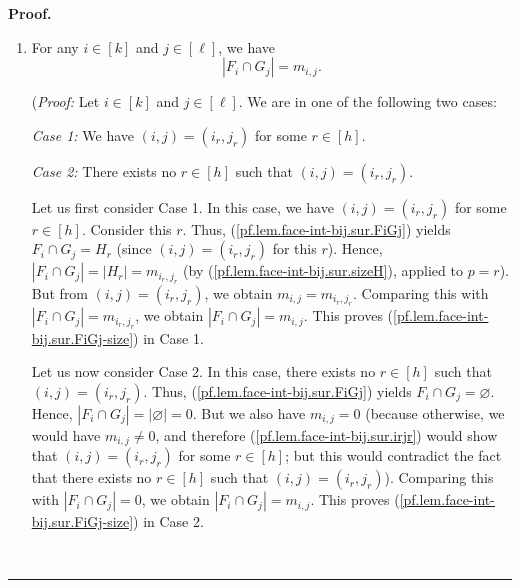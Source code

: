 \documentclass[12pt]{article}
\theoremstyle{definition}%
\theoremstyle{definition}%
\theoremstyle{remark}%
\newcommand{\interval}[1]{\left[ #1 \right]} %
\newenvironment{proof}[1][Proof]{\noindent\textbf{#1.} }{\ \rule{0.5em}{0.5em}}
\begin{document}
\begin{proof}
\begin{enumerate}
Forget that we fixed $x$. We thus have obtained a contradiction for each $x\in
F_{i}\cap G_{j}$. Hence, there exists no such $x$. In other words, $F_{i}\cap
G_{j}=\varnothing$. This completes the proof of
(\ref{pf.lem.face-int-bij.sur.FiGj}) in Case 2.

We have now proved (\ref{pf.lem.face-int-bij.sur.FiGj}) in both Cases 1 and 2;
this completes the proof of (\ref{pf.lem.face-int-bij.sur.FiGj}).)

\item For any $i\in\interval{k}  $ and $j\in\interval{\ell}$, we
have
\begin{equation}
\left\vert F_{i}\cap G_{j}\right\vert =m_{i,j} .
\label{pf.lem.face-int-bij.sur.FiGj-size}
\end{equation}


(\textit{Proof:} Let $i\in\interval{k}  $ and $j\in\interval{\ell}$.
We are in one of the following two cases:

\textit{Case 1:} We have $\left(  i,j\right)  =\left(  i_{r},j_{r}\right)  $
for some $r\in\interval{h} $.

\textit{Case 2:} There exists no $r\in\interval{h} $ such that $\left(
i,j\right)  =\left(  i_{r},j_{r}\right)  $.

Let us first consider Case 1. In this case, we have $\left(  i,j\right)
=\left(  i_{r},j_{r}\right)  $ for some $r\in\interval{h} $. Consider
this $r$. Thus, (\ref{pf.lem.face-int-bij.sur.FiGj}) yields $F_{i}\cap
G_{j}=H_{r}$ (since $\left(  i,j\right)  =\left(  i_{r},j_{r}\right)  $ for
this $r$). Hence, $\left\vert F_{i}\cap G_{j}\right\vert =\left\vert
H_{r}\right\vert =m_{i_{r},j_{r}}$ (by (\ref{pf.lem.face-int-bij.sur.sizeH}),
applied to $p=r$). But from $\left(  i,j\right)  =\left(  i_{r},j_{r}\right)
$, we obtain $m_{i,j}=m_{i_{r},j_{r}}$. Comparing this with $\left\vert
F_{i}\cap G_{j}\right\vert =m_{i_{r},j_{r}}$, we obtain $\left\vert F_{i}\cap
G_{j}\right\vert =m_{i,j}$. This proves
(\ref{pf.lem.face-int-bij.sur.FiGj-size}) in Case 1.

Let us now consider Case 2. In this case, there exists no $r\in
\interval{h}$ such that $\left(  i,j\right)  =\left(  i_{r},j_{r}\right)  $.
Thus, (\ref{pf.lem.face-int-bij.sur.FiGj}) yields $F_{i}\cap G_{j}
=\varnothing$. Hence, $\left\vert F_{i}\cap G_{j}\right\vert =\left\vert
\varnothing\right\vert =0$. But we also have $m_{i,j}=0$ (because otherwise,
we would have $m_{i,j}\neq0$, and therefore
(\ref{pf.lem.face-int-bij.sur.irjr}) would show that $\left(  i,j\right)
=\left(  i_{r},j_{r}\right)  $ for some $r\in\interval{h} $; but this
would contradict the fact that there exists no $r\in\interval{h} $ such
that $\left(  i,j\right)  =\left(  i_{r},j_{r}\right)  $). Comparing this with
$\left\vert F_{i}\cap G_{j}\right\vert =0$, we obtain $\left\vert F_{i}\cap
G_{j}\right\vert =m_{i,j}$. This proves
(\ref{pf.lem.face-int-bij.sur.FiGj-size}) in Case 2.


\end{enumerate}
\end{proof}
\end{document}
